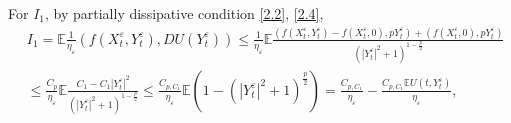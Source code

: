 \documentclass[11pt,reqno]{amsart}
\numberwithin{equation}{section}
\begin{document}
\iffalse	
	For $I_{1}$, by partially dissipative condition \eqref{2.2}, \eqref{2.4},
	\begin{equation}\label{3.16}
		\begin{split}
			&I_{1}=\mathbb{E} \frac{1}{\eta_{\varepsilon}}( f(X_{t}^{\varepsilon},Y_{t}^{\varepsilon}),DU(Y_{t}^{\varepsilon})) \leq\frac{1}{\eta_{\varepsilon}} \mathbb{E}  \frac{( f(X_{t}^{\varepsilon},Y_{t}^{\varepsilon})-f(X_{t}^{\varepsilon},0),pY_{t}^{\varepsilon}) +( f(X_{t}^{\varepsilon},0),pY_{t}^{\varepsilon})}{(|Y_{t}^{\varepsilon}|^{2}+1)^{1-\frac{p}{2}}}\\
			&\leq  \frac{C_{p}}{\eta_{\varepsilon}}\mathbb{E} \frac{C_{1}-C_{1}|Y_{t}^{\varepsilon}|^{2}}{(|Y_{t}^{\varepsilon}|^{2}+1)^{1-\frac{p}{2}}}\leq \frac{C_{p,C_{1}}}{\eta_{\varepsilon}}\mathbb{E}\left( 1-(|Y_{t}^{\varepsilon}|^{2}+1)^{\frac{p}{2}}\right)=\frac{C_{p,C_{1}}}{\eta_{\varepsilon}}-\frac{C_{p,C_{1}}\mathbb{E}U(t,Y_{t}^{\varepsilon})}{\eta_{\varepsilon}},  
		\end{split}
	\end{equation}
\end{document}
